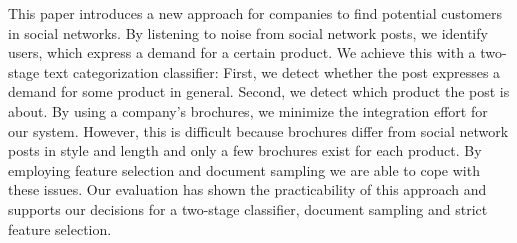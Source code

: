 
This paper introduces a new approach for companies to find potential customers in social networks.
By listening to noise from social network posts, we identify users, which express a demand for a certain product.
We achieve this with a two-stage text categorization classifier:
First, we detect whether the post  expresses a demand for some product in general.
Second, we detect which product the post is about.
By using a company's brochures, we minimize the integration effort for our system.
However, this is difficult because brochures differ from social network posts in style and length and only a few brochures exist for each product.
By employing feature selection and document sampling we are able to cope with these issues.
Our evaluation has shown the practicability of this approach and supports our decisions for a two-stage classifier, document sampling and strict feature selection.
